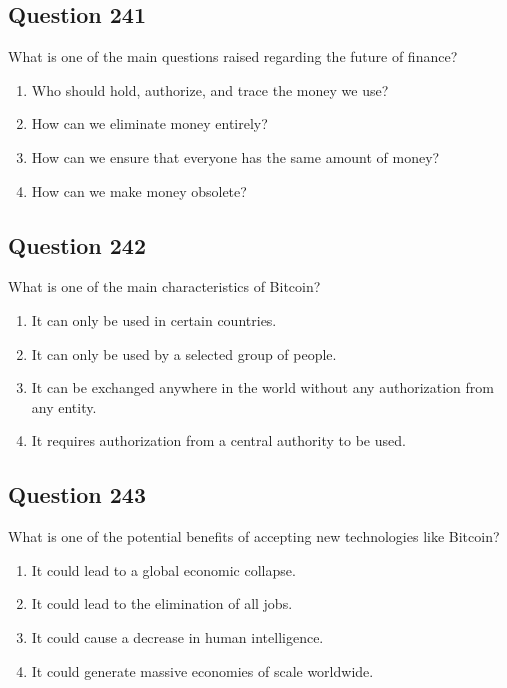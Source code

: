 \documentclass[12pt,a4paper]{article}
\begin{document}
\bigskip


\subsection*{Question 241}
What is one of the main questions raised regarding the future of finance?

\begin{enumerate}[label=\Alph*., leftmargin=*]
\item Who should hold, authorize, and trace the money we use?
\item How can we eliminate money entirely?
\item How can we ensure that everyone has the same amount of money?
\item How can we make money obsolete?
\end{enumerate}

\bigskip


\subsection*{Question 242}
What is one of the main characteristics of Bitcoin?

\begin{enumerate}[label=\Alph*., leftmargin=*]
\item It can only be used in certain countries.
\item It can only be used by a selected group of people.
\item It can be exchanged anywhere in the world without any authorization from any entity.
\item It requires authorization from a central authority to be used.
\end{enumerate}

\bigskip


\subsection*{Question 243}
What is one of the potential benefits of accepting new technologies like Bitcoin?

\begin{enumerate}[label=\Alph*., leftmargin=*]
\item It could lead to a global economic collapse.
\item It could lead to the elimination of all jobs.
\item It could cause a decrease in human intelligence.
\item It could generate massive economies of scale worldwide.
\end{enumerate}
\end{document}
